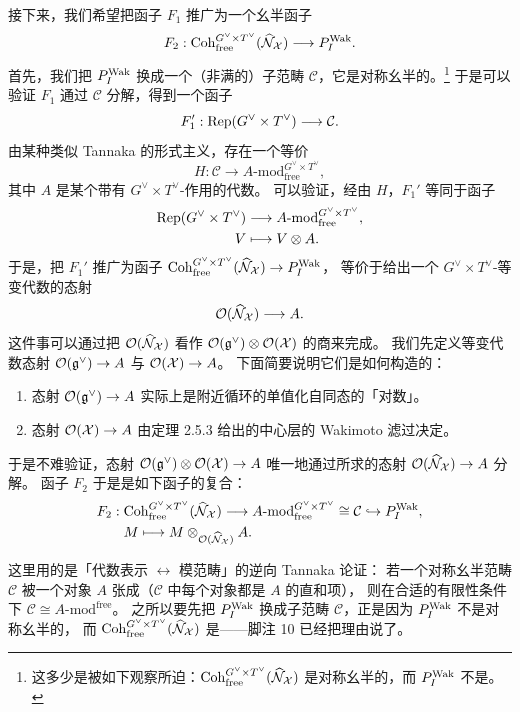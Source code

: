 接下来，我们希望把函子 $F_1$ 推广为一个幺半函子
\[
F_2:\mathrm{Coh}^{G^\vee\times T^\vee}_{\mathrm{free}}(\widehat{\mathcal{N}}_{\mathcal{X}})\longrightarrow P_I^{\mathrm{Wak}} .
\]
首先，我们把 $P_I^{\mathrm{Wak}}$ 换成一个（非满的）子范畴 $\mathcal{C}$，它是对称幺半的。\footnote{这多少是被如下观察所迫：$\mathrm{Coh}^{G^\vee\times T^\vee}_{\mathrm{free}}(\widehat{\mathcal{N}}_{\mathcal{X}})$ 是对称幺半的，而 $P_I^{\mathrm{Wak}}$ 不是。}
于是可以验证 $F_1$ 通过 $\mathcal{C}$ 分解，得到一个函子
\[
F_1':\mathrm{Rep}(G^\vee\times T^\vee)\longrightarrow\mathcal{C}.
\]
由某种类似 Tannaka 的形式主义，存在一个等价
\[
H:\mathcal{C}\longrightarrow A\text{-}\mathrm{mod}^{G^\vee\times T^\vee}_{\mathrm{free}},
\]
其中 $A$ 是某个带有 $G^\vee\times T^\vee$-作用的代数。
可以验证，经由 $H$，$F_1'$ 等同于函子
\begin{align*}
\mathrm{Rep}(G^\vee\times T^\vee)&\longrightarrow A\text{-}\mathrm{mod}^{G^\vee\times T^\vee}_{\mathrm{free}},\\
V&\longmapsto V\otimes A .
\end{align*}
于是，把 $F_1'$ 推广为函子 $\mathrm{Coh}^{G^\vee\times T^\vee}_{\mathrm{free}}(\widehat{\mathcal{N}}_{\mathcal{X}})\to P_I^{\mathrm{Wak}}$，
等价于给出一个 $G^\vee\times T^\vee$-等变代数的态射
\[
\mathcal{O}(\widehat{\mathcal{N}}_{\mathcal{X}})\longrightarrow A .
\]
这件事可以通过把 $\mathcal{O}(\widehat{\mathcal{N}}_{\mathcal{X}})$ 看作 $\mathcal{O}(\mathfrak{g}^\vee)\otimes\mathcal{O}(\mathcal{X})$ 的商来完成。
我们先定义等变代数态射 $\mathcal{O}(\mathfrak{g}^\vee)\to A$ 与 $\mathcal{O}(\mathcal{X})\to A$。
下面简要说明它们是如何构造的：
\begin{enumerate}[label=(\arabic*),leftmargin=2.2em,itemsep=1pt]
\item 态射 $\mathcal{O}(\mathfrak{g}^\vee)\to A$ 实际上是附近循环的单值化自同态的「对数」。
\item 态射 $\mathcal{O}(\mathcal{X})\to A$ 由定理 2.5.3 给出的中心层的 Wakimoto 滤过决定。
\end{enumerate}
于是不难验证，态射 $\mathcal{O}(\mathfrak{g}^\vee)\otimes\mathcal{O}(\mathcal{X})\to A$ 唯一地通过所求的态射 $\mathcal{O}(\widehat{\mathcal{N}}_{\mathcal{X}})\to A$ 分解。
函子 $F_2$ 于是是如下函子的复合：
\begin{align*}
F_2:\;&\mathrm{Coh}^{G^\vee\times T^\vee}_{\mathrm{free}}(\widehat{\mathcal{N}}_{\mathcal{X}})\longrightarrow
A\text{-}\mathrm{mod}^{G^\vee\times T^\vee}_{\mathrm{free}}\cong\mathcal{C}\hookrightarrow P_I^{\mathrm{Wak}},\\
&M\longmapsto M\otimes_{\mathcal{O}(\widehat{\mathcal{N}}_{\mathcal{X}})}A .
\end{align*}

\begin{yizhu}
这里用的是「代数表示 $\leftrightarrow$ 模范畴」的逆向 Tannaka 论证：
若一个对称幺半范畴 $\mathcal{C}$ 被一个对象 $A$ 张成（$\mathcal{C}$ 中每个对象都是 $A$ 的直和项），
则在合适的有限性条件下 $\mathcal{C}\cong A\text{-}\mathrm{mod}^{\mathrm{free}}$。
之所以要先把 $P_I^{\mathrm{Wak}}$ 换成子范畴 $\mathcal{C}$，正是因为 $P_I^{\mathrm{Wak}}$ 不是对称幺半的，
而 $\mathrm{Coh}_{\mathrm{free}}^{G^\vee\times T^\vee}(\widehat{\mathcal{N}}_{\mathcal{X}})$ 是——脚注 10 已经把理由说了。
\end{yizhu}

